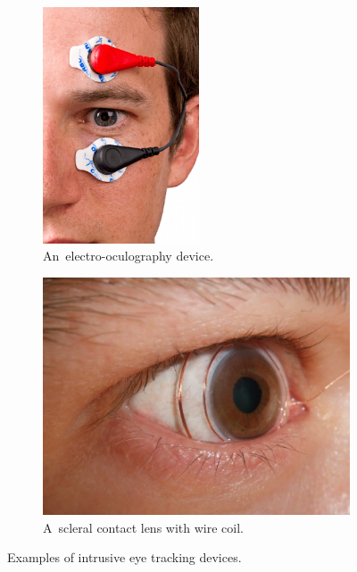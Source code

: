 \begin{figure}[!ht]\centering
    \begin{subfigure}[b]{0.45\textwidth}
        \centering
        \includegraphics[width=0.51\textwidth]{img/eog.png}
        \caption{An~electro-oculography device.~\cite{fig:eog} }
        \label{fig:eog}
    \end{subfigure}
    \hfill
    \begin{subfigure}[b]{0.45\textwidth}
        \centering
        \includegraphics[width=\textwidth]{img/scleral-contact-lens.png}
        \caption{A~scleral contact lens with wire coil.~\cite{fig:scleral-lens}}
        \label{fig:contact-lens}
    \end{subfigure}
    \caption{Examples of intrusive eye tracking devices.}
\end{figure}

